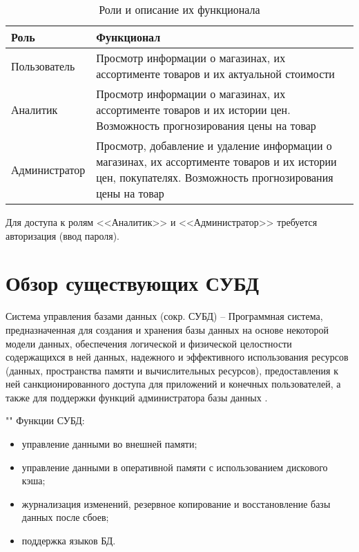 \documentclass[a4paper,14pt]{extreport}
\begin{document}
\begin{table}[H]
	\caption{Роли и описание их функционала}
	\begin{center}
		\begin{tabular}{| l | p{12 cm} |} 
			\hline
			
			\textbf{Роль} & \textbf{Функционал} \\  
			
			\hline
			
			Пользователь & Просмотр информации о магазинах, их ассортименте товаров и их актуальной стоимости \\
			
			\hline
			
			Аналитик & Просмотр информации о магазинах, их ассортименте товаров и их истории цен. Возможность прогнозирования цены на товар \\
			
			\hline
			
			Администратор & Просмотр, добавление и удаление информации о магазинах, их ассортименте товаров и их истории цен, покупателях. Возможность прогнозирования цены на товар \\
			
			\hline
		\end{tabular}
	\end{center}
\end{table}

Для доступа к ролям <<Аналитик>> и <<Администратор>> требуется авторизация (ввод пароля).

\section{Обзор существующих СУБД}

Система управления базами данных (сокр. СУБД) -- Программная система, предназначенная для создания и хранения базы данных на основе некоторой модели данных, обеспечения логической и физической целостности содержащихся в ней данных, надежного и эффективного использования ресурсов (данных, пространства памяти и вычислительных ресурсов), предоставления к ней санкционированного доступа для приложений и конечных пользователей, а также для поддержки 
функций администратора базы данных \cite{kogal}.

""\newline
Функции СУБД:

\begin{itemize}
	\setlength\itemsep{0.01em}
	\item управление данными во внешней памяти;
	\item управление данными в оперативной памяти с использованием дискового кэша;
	\item журнализация изменений, резервное копирование и восстановление базы данных после сбоев;
	\item поддержка языков БД.
\end{itemize}
\end{document}
